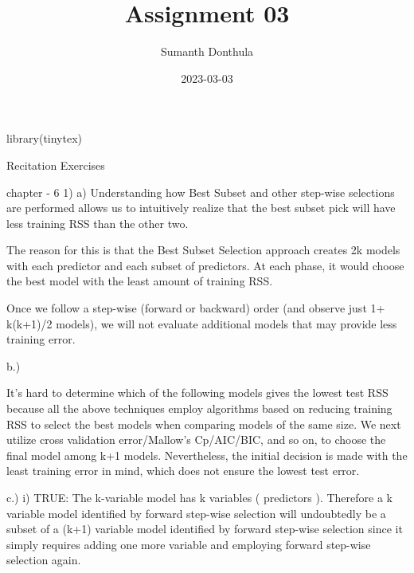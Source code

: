\documentclass[
]{article}
\title{Assignment 03}
\author{Sumanth Donthula}
\date{2023-03-03}
\newenvironment{Shaded}{\begin{snugshade}}{\end{snugshade}}
\newcommand{\FunctionTok}[1]{\textcolor[rgb]{0.00,0.00,0.00}{#1}}
\newcommand{\NormalTok}[1]{#1}
\begin{document}
\maketitle

\begin{Shaded}
\begin{Highlighting}[]
\FunctionTok{library}\NormalTok{(tinytex)}
\end{Highlighting}
\end{Shaded}

Recitation Exercises

chapter - 6 1) a) Understanding how Best Subset and other step-wise
selections are performed allows us to intuitively realize that the best
subset pick will have less training RSS than the other two.

The reason for this is that the Best Subset Selection approach creates
2k models with each predictor and each subset of predictors. At each
phase, it would choose the best model with the least amount of training
RSS.

Once we follow a step-wise (forward or backward) order (and observe just
1+ k(k+1)/2 models), we will not evaluate additional models that may
provide less training error.

b.)

It's hard to determine which of the following models gives the lowest
test RSS because all the above techniques employ algorithms based on
reducing training RSS to select the best models when comparing models of
the same size. We next utilize cross validation error/Mallow's
Cp/AIC/BIC, and so on, to choose the final model among k+1 models.
Nevertheless, the initial decision is made with the least training error
in mind, which does not ensure the lowest test error.

c.) i) TRUE: The k-variable model has k variables ( predictors ).
Therefore a k variable model identified by forward step-wise selection
will undoubtedly be a subset of a (k+1) variable model identified by
forward step-wise selection since it simply requires adding one more
variable and employing forward step-wise selection again.
\end{document}
